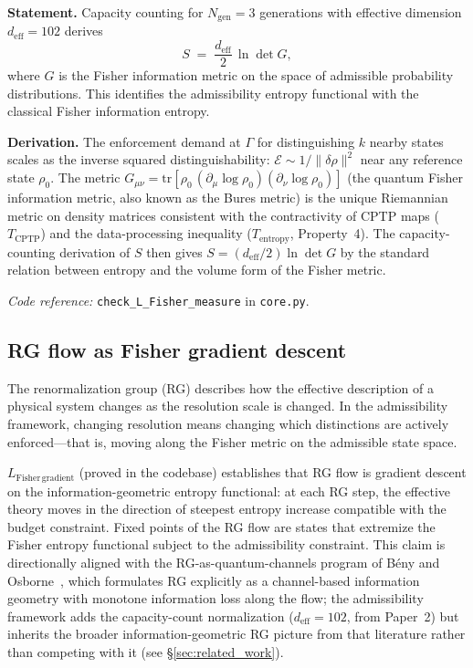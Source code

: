 \documentclass[11pt]{article}
\newcommand{\coderef}[2]{\smallskip\noindent\textit{Code reference:} \texttt{#1} in \texttt{#2}.}
\newcommand{\epitag}[1]{\textbf{[#1]}}
\begin{document}
\begin{tcolorbox}[apfbox, title={Lemma $L_{\mathrm{Fisher}}$ (Fisher Information from Capacity Counting) \epitag{P}}]
\textbf{Statement.}
Capacity counting for $N_{\mathrm{gen}} = 3$ generations with effective
dimension $d_{\mathrm{eff}} = 102$ derives
\[
  S \;=\; \frac{d_{\mathrm{eff}}}{2}\,\ln\det G,
\]
where $G$ is the Fisher information metric on the space of admissible
probability distributions.  This identifies the admissibility entropy
functional with the classical Fisher information entropy.

\textbf{Derivation.}
The enforcement demand at $\Gamma$ for distinguishing $k$ nearby states
scales as the inverse squared distinguishability: $\mathcal{E} \sim
1/\|\delta\rho\|^2$ near any reference state $\rho_0$.  The metric
$G_{\mu\nu} = \mathrm{tr}[\rho_0\,(\partial_\mu\log\rho_0)(\partial_\nu\log\rho_0)]$
(the quantum Fisher information metric, also known as the Bures metric) is
the unique Riemannian metric on density matrices consistent with the
contractivity of CPTP maps ($T_{\mathrm{CPTP}}$) and the data-processing
inequality ($T_{\mathrm{entropy}}$, Property~4).  The capacity-counting
derivation of $S$ then gives $S = (d_{\mathrm{eff}}/2)\ln\det G$ by the
standard relation between entropy and the volume form of the Fisher metric.

\coderef{check\_L\_Fisher\_measure}{core.py}
\end{tcolorbox}

\subsection{RG flow as Fisher gradient descent}

The renormalization group (RG) describes how the effective description of
a physical system changes as the resolution scale is changed.  In the
admissibility framework, changing resolution means changing which distinctions
are actively enforced---that is, moving along the Fisher metric on the
admissible state space.

$L_{\mathrm{Fisher\,gradient}}$ (proved in the codebase) establishes that RG
flow is gradient descent on the information-geometric entropy functional: at
each RG step, the effective theory moves in the direction of steepest entropy
increase compatible with the budget constraint.  Fixed points of the RG flow
are states that extremize the Fisher entropy functional subject to the
admissibility constraint.  This claim is directionally aligned with the
RG-as-quantum-channels program of B\'eny and
Osborne~\cite{BenyOsborne2015}, which formulates RG explicitly as a
channel-based information geometry with monotone information loss along the
flow; the admissibility framework adds the capacity-count normalization
($d_{\mathrm{eff}} = 102$, from Paper~2) but inherits the broader
information-geometric RG picture from that literature rather than
competing with it (see \S\ref{sec:related_work}).
\end{document}
